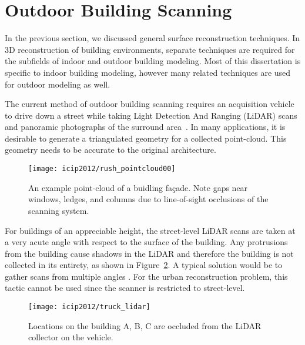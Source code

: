 \documentclass[12pt,onecolumn,oneside]{book}
\begin{document}
\section{Outdoor Building Scanning}
\label{sec:outdoor_scanning}

In the previous section, we discussed general surface reconstruction techniques.  In 3D reconstruction of building environments, separate techniques are required for the subfields of indoor and outdoor building modeling.  Most of this dissertation is specific to indoor building modeling, however many related techniques are used for outdoor modeling as well.

The current method of outdoor building scanning requires an acquisition vehicle to drive down a street while taking Light Detection And Ranging (LiDAR) scans and panoramic photographs of the surround area~\cite{Zakhor07,Chen07,Karimi00,Li97}.  In many applications, it is desirable to generate a triangulated geometry for a collected point-cloud.  This geometry needs to be accurate to the original architecture.  

\begin{figure}
	\begin{minipage}[b]{1.0\linewidth}
	  \centering
	  \centerline{\texttt{[image: icip2012/rush\_pointcloud00]}}
	\end{minipage}

	\caption[An example point-cloud of a building fa\c{c}ade.]{An example point-cloud of a buidling fa\c{c}ade. Note gaps near windows, ledges, and columns due to line-of-sight occlusions of the scanning system.}
	\label{fig:rush_points}
\end{figure}

For buildings of an appreciable height, the street-level LiDAR scans are taken at a very acute angle with respect to the surface of the building.  Any protrusions from the building cause shadows in the LiDAR and therefore the building is not collected in its entirety, as shown in Figure~\ref{fig:truck_lidar}.  A typical solution would be to gather scans from multiple angles \cite{Tang10, Curless96}.  For the urban reconstruction problem, this tactic cannot be used since the scanner is restricted to street-level.

\begin{figure}[t]

\begin{minipage}[b]{1.0\linewidth}
  \centering
  \centerline{\texttt{[image: icip2012/truck\_lidar]}}
\end{minipage}

\caption[Scanning building fa\c{c}ades from a vehicle.]{Locations on the building A, B, C are occluded from the LiDAR collector on the vehicle.}
\label{fig:truck_lidar}

\end{figure}
\end{document}
